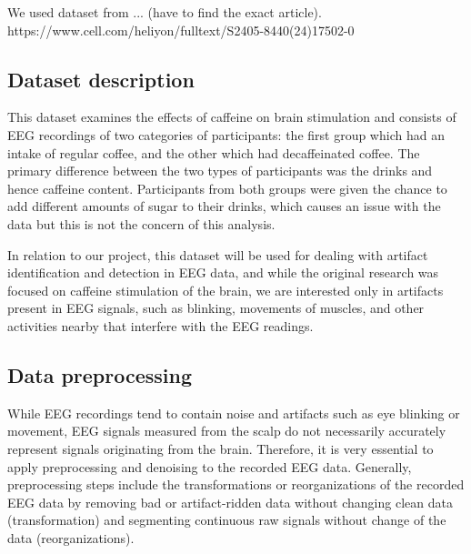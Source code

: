 \documentclass[12pt,a4paper,titlepage,openany]{report}
\begin{document}
We used dataset from ... (have to find the exact article). https://www.cell.com/heliyon/fulltext/S2405-8440(24)17502-0

\subsection{Dataset description}

This dataset examines the effects of caffeine on brain stimulation and consists of EEG recordings of two categories of participants: the first group which had an intake of regular coffee, and the other which had decaffeinated coffee. 
The primary difference between the two types of participants was the drinks and hence caffeine content. 
Participants from both groups were given the chance to add different amounts of sugar to their drinks, which causes an issue with the data but this is not the concern of this analysis.

In relation to our project, this dataset will be used for dealing with artifact identification and detection in EEG data, and while the original research was focused on caffeine stimulation of the brain, we are interested only in artifacts present in EEG signals, such as blinking, movements of muscles, and other activities nearby that interfere with the EEG readings.

\subsection{Data preprocessing}

While EEG recordings tend to contain noise and artifacts such as eye blinking or movement, EEG signals measured from the scalp do not necessarily accurately represent signals originating from the brain. 
Therefore, it is very essential to apply preprocessing and denoising to the recorded EEG data. 
Generally, preprocessing steps include the transformations or reorganizations of the recorded EEG data by removing bad or artifact-ridden data without changing clean data (transformation) and segmenting continuous raw signals without change of the data (reorganizations).
\end{document}
